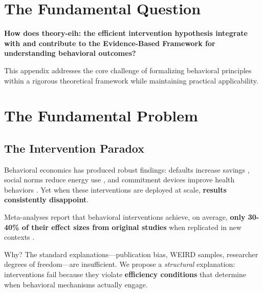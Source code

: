 \section{The Fundamental Question}
\label{sec:eih-fundamental}

\begin{tcolorbox}[
    colback=red!5!white,
    colframe=red!75!black,
    title={\textbf{Fundamental Question}}
]
\textbf{How does theory-eih: the efficient intervention hypothesis integrate with and contribute to the
Evidence-Based Framework for understanding behavioral outcomes?}

This appendix addresses the core challenge of formalizing behavioral principles
within a rigorous theoretical framework while maintaining practical applicability.
\end{tcolorbox}






\section{The Fundamental Problem}
\label{sec:eih-problem}

\subsection{The Intervention Paradox}

Behavioral economics has produced robust findings: defaults increase savings
\citep{madrian2001}, social norms reduce energy use \citep{allcott2011}, and
commitment devices improve health behaviors \citep{ashraf2006}. Yet when these
interventions are deployed at scale, \textbf{results consistently disappoint}.

\begin{tcolorbox}[colback=red!5!white, colframe=red!75!black,
    title=The Stylized Fact]
Meta-analyses report that behavioral interventions achieve, on average,
\textbf{only 30-40\% of their effect sizes from original studies} when
replicated in new contexts \citep{dellavigna2022}.
\end{tcolorbox}

Why? The standard explanations---publication bias, WEIRD samples, researcher
degrees of freedom---are insufficient. We propose a \textit{structural} explanation:
interventions fail because they violate \textbf{efficiency conditions} that determine
when behavioral mechanisms actually engage.

